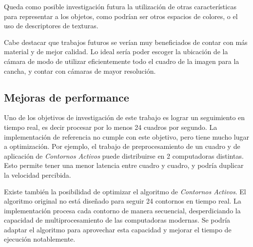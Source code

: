 Queda como posible investigación futura la utilización de otras características
para representar a los objetos, como podrían ser otros espacios de colores, o
el uso de descriptores de texturas.

Cabe destacar que trabajos futuros se verían muy beneficiados de contar con más
material y de mejor calidad. Lo ideal sería poder escoger la ubicación de la
cámara de modo de utilizar eficientemente todo el cuadro de la imagen para la
cancha, y contar con cámaras de mayor resolución.

\subsection{Mejoras de performance}

Uno de los objetivos de investigación de este trabajo es lograr un seguimiento en
tiempo real, es decir procesar por lo menos 24 cuadros por segundo. La implementación
de referencia no cumple con este objetivo, pero tiene mucho lugar a optimización.
Por ejemplo, el trabajo de preprocesamiento de un cuadro y de aplicación de \textit{Contornos
Activos} puede distribuirse en 2 computadoras distintas. Esto permite tener una menor
latencia entre cuadro y cuadro, y podría duplicar la velocidad percibida.

Existe también la posibilidad de optimizar el algoritmo de \textit{Contornos
Activos}. El algoritmo original no está diseñado para seguir 24 contornos en
tiempo real. La implementación procesa cada contorno de manera secuencial,
desperdiciando la capacidad de multiprocesamiento de las computadoras modernas.
Se podría adaptar el algoritmo para aprovechar esta capacidad y mejorar el
tiempo de ejecución notablemente.

